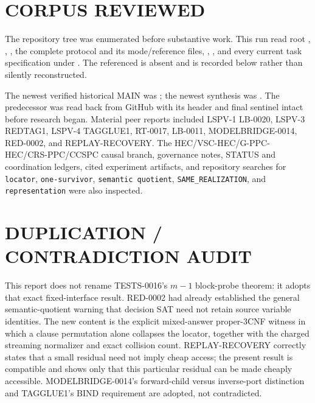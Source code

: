 \documentclass[11pt]{article}
\begin{document}
\section{CORPUS REVIEWED}

The repository tree was enumerated before substantive work.  This run read
root , , , the complete
 protocol and its mode/reference
files, , , and every current task specification
under .  The referenced  is
absent and is recorded below rather than silently reconstructed.

The newest verified historical MAIN was
; the newest
synthesis was
.
The predecessor
was read back from GitHub with its header and final sentinel intact before
research began.  Material peer reports included LSPV-1 LB-0020, LSPV-3
REDTAG1, LSPV-4 TAGGLUE1, RT-0017, LB-0011, MODELBRIDGE-0014, RED-0002, and
REPLAY-RECOVERY.  The HEC/VSC-HEC/G-PPC-HEC/CRS-PPC/CCSPC causal branch,
governance notes, STATUS and coordination ledgers, cited experiment artifacts,
and repository searches for \texttt{locator}, \texttt{one-survivor},
\texttt{semantic quotient}, \texttt{SAME\_REALIZATION}, and
\texttt{representation} were also inspected.

\section{DUPLICATION / CONTRADICTION AUDIT}

This report does not rename TESTS-0016's $m-1$ block-probe theorem: it adopts
that exact fixed-interface result.  RED-0002 had already established the
general semantic-quotient warning that decision SAT need not retain source
variable identities.  The new content is the explicit mixed-answer
proper-$3$CNF witness in which a clause permutation alone collapses the
locator, together with the charged streaming normalizer and exact collision
count.  REPLAY-RECOVERY correctly states that a small residual need not imply
cheap access; the present result is compatible and shows only that this
particular residual can be made cheaply accessible.  MODELBRIDGE-0014's
forward-child versus inverse-port distinction and TAGGLUE1's BIND requirement
are adopted, not contradicted.
\end{document}
